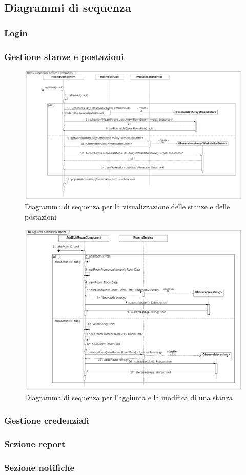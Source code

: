 \subsection{Diagrammi di sequenza}
\subsubsection{Login}
\subsubsection{Gestione stanze e postazioni}
\begin{figure}[H]
	\centering
	\includegraphics[width=18cm]{res/images/webapp-visualStanzePostazioni-diagrammaSequenza.png}
	\caption{Diagramma di sequenza per la visualizzazione delle stanze e delle postazioni}
	\label{fig:DiagrammaSequenzaStanzePostazioni1}
\end{figure}
\begin{figure}[H]
	\centering
	\includegraphics[width=18cm]{res/images/webapp-addEditStanzePostazioni-diagrammaSequenza.png}
	\caption{Diagramma di sequenza per l'aggiunta e la modifica di una stanza}
	\label{fig:DiagrammaSequenzaStanzePostazioni2}
\end{figure}
\subsubsection{Gestione credenziali}
\subsubsection{Sezione report}
\subsubsection{Sezione notifiche}




